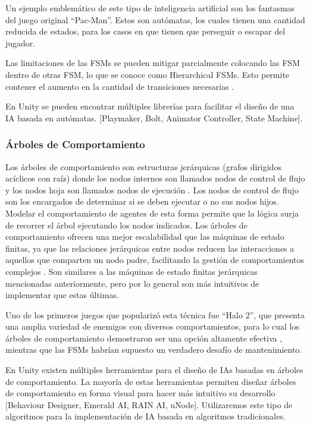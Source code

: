 \documentclass[a4paper]{article}
\begin{document}
Un ejemplo emblemático de este tipo de inteligencia artificial son los fantasmas del juego original “Pac-Man”. Estos son autómatas, los cuales tienen una cantidad reducida de estados, para los casos en que tienen que perseguir o escapar del jugador.

Las limitaciones de las FSMs se pueden mitigar parcialmente colocando las FSM dentro de otras FSM, lo que se conoce como Hierarchical FSMs. Esto permite contener el aumento en la cantidad de transiciones necesarias \cite{finite_state_machine_in_game_development}.

En Unity se pueden encontrar múltiples librerías para facilitar el diseño de una IA basada en autómatas. [Playmaker, Bolt, Animator Controller, State Machine].

\subsubsection{Árboles de Comportamiento}

Los árboles de comportamiento son estructuras jerárquicas (grafos dirigidos acíclicos con raíz) donde los nodos internos son llamados nodos de control de flujo y los nodos hoja son llamados nodos de ejecución \cite{behavior_tress_in_robotics_and_ai}. Los nodos de control de flujo son los encargados de determinar si se deben ejecutar o no sus nodos hijos. Modelar el comportamiento de agentes de esta forma permite que la lógica surja de recorrer el árbol ejecutando los nodos indicados. Los árboles de comportamiento ofrecen una mejor escalabilidad que las máquinas de estado finitas, ya que las relaciones jerárquicas entre nodos reducen las interacciones a aquellos que comparten un nodo padre, facilitando la gestión de comportamientos complejos \cite{behavior_tress_in_robotics_and_ai}. Son similares a las máquinas de estado finitas jerárquicas mencionadas anteriormente, pero por lo general son más intuitivos de implementar que estas últimas.

Uno de los primeros juegos que popularizó esta técnica fue “Halo 2”, que presenta una amplia  variedad de enemigos con diversos comportamientos, para lo cual los árboles de comportamiento demostraron ser una opción altamente efectiva \cite{implementation_of_behavior_tree_in_halo_2}, mientras que las FSMs habrían supuesto un verdadero desafío de mantenimiento.

En Unity existen múltiples herramientas para el diseño de IAs basadas en árboles de comportamiento. La mayoría de estas herramientas permiten diseñar árboles de comportamiento en forma visual para hacer más intuitivo su desarrollo [Behaviour Designer, Emerald AI, RAIN AI, uNode]. Utilizaremos este tipo de algoritmos para la implementación de IA basada en algoritmos tradicionales.
\end{document}
